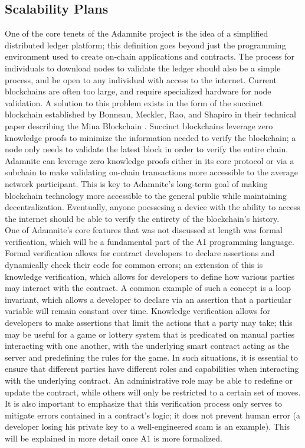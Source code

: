 \documentclass[conference]{IEEEtran}
\begin{document}
\subsection{Scalability Plans}
One of the core tenets of the Adamnite project is the idea of a simplified distributed ledger platform; this definition goes beyond just the programming environment used to create on-chain applications and contracts. The process for individuals to download nodes to validate the ledger should also be a simple process, and be open to any individual with access to the internet. Current blockchains are often too large, and require specialized hardware for node validation. A solution to this problem exists in the form of the succinct blockchain established by Bonneau, Meckler, Rao, and Shapiro in their technical paper describing the Mina Blockchain \cite{bonneau2020Mina}. Succinct blockchains leverage zero knowledge proofs to minimize the information needed to verify the blockchain; a node only needs to validate the latest block in order to verify the entire chain. Adamnite can leverage zero knowledge proofs either in its core protocol or via a subchain to make validating on-chain transactions more accessible to the average network participant. This is key to Adamnite's long-term goal of making blockchain technology more accessible to the general public while maintaining decentralization. Eventually, anyone poessesing a device with the ability to access the internet should be able to verify the entirety of the blockchain's history.   \\
One of Adamnite's core features that was not discussed at length was formal verification, which will be a fundamental part of the A1 programming language. Formal verification allows for contract developers to declare assertions and dynamically check their code for common errors; an extension of this is knowledge verification, which allows for developers to define how various parties may interact with the contract. A common example of such a concept is a loop invariant, which allows a developer to declare via an assertion that a particular variable will remain constant over time. Knowledge verification allows for developers to make assertions that limit the actions that a party may take; this may be useful for a game or lottery system that is predicated on manual parties interacting with one another, with the underlying smart contract acting as the server and predefining the rules for the game. In such situations, it is essential to ensure that different parties have different roles and capabilities when interacting with the underlying contract. An administrative role may be able to redefine or update the contract, while others will only be restricted to a certain set of moves. It is also important to emphasize that this verification process only serves to mitigate errors contained in a contract's logic; it does not prevent human error (a developer losing his private key to a well-engineered scam is an example). This will be explained in more detail once A1 is more formalized.
\end{document}
